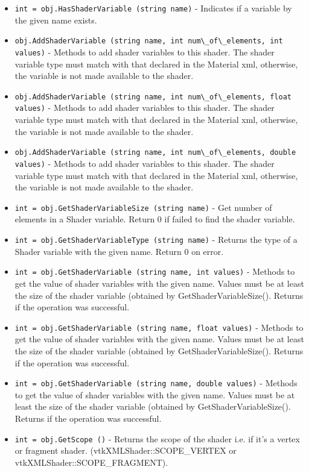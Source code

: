\begin{itemize}
\item  \verb|int = obj.HasShaderVariable (string name)| -  Indicates if a variable by the given name exists.

\item  \verb|obj.AddShaderVariable (string name, int num\_of\_elements, int values)| -  Methods to add shader variables to this shader.
 The shader variable type must match with that declared in
 the Material xml, otherwise, the variable is not made available 
 to the shader.

\item  \verb|obj.AddShaderVariable (string name, int num\_of\_elements, float values)| -  Methods to add shader variables to this shader.
 The shader variable type must match with that declared in
 the Material xml, otherwise, the variable is not made available 
 to the shader.

\item  \verb|obj.AddShaderVariable (string name, int num\_of\_elements, double values)| -  Methods to add shader variables to this shader.
 The shader variable type must match with that declared in
 the Material xml, otherwise, the variable is not made available 
 to the shader.

\item  \verb|int = obj.GetShaderVariableSize (string name)| -  Get number of elements in a Shader variable. Return 0 if
 failed to find the shader variable.

\item  \verb|int = obj.GetShaderVariableType (string name)| -  Returns the type of a Shader variable with the given name.
 Return 0 on error.

\item  \verb|int = obj.GetShaderVariable (string name, int values)| -  Methods to get the value of shader variables with the given name.
 Values must be at least the size of the shader variable (obtained
 by GetShaderVariableSize(). Returns if the operation was successful.

\item  \verb|int = obj.GetShaderVariable (string name, float values)| -  Methods to get the value of shader variables with the given name.
 Values must be at least the size of the shader variable (obtained
 by GetShaderVariableSize(). Returns if the operation was successful.

\item  \verb|int = obj.GetShaderVariable (string name, double values)| -  Methods to get the value of shader variables with the given name.
 Values must be at least the size of the shader variable (obtained
 by GetShaderVariableSize(). Returns if the operation was successful.

\item  \verb|int = obj.GetScope ()| -  Returns the scope of the shader i.e. if it's a vertex or fragment shader.
 (vtkXMLShader::SCOPE\_VERTEX or vtkXMLShader::SCOPE\_FRAGMENT).

\end{itemize}
